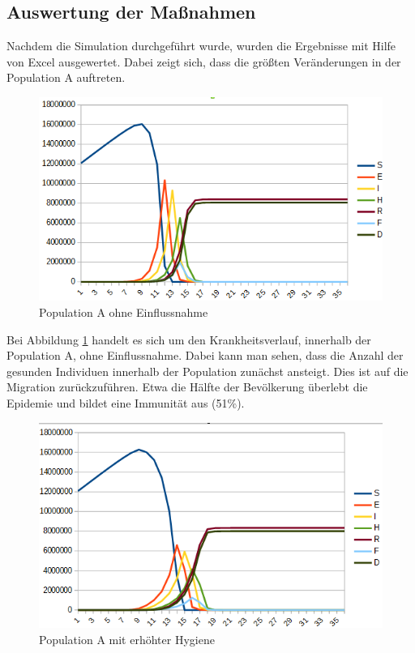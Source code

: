 \subsection{Auswertung der Maßnahmen}\label{ssec:actions:sim}

\ellen
Nachdem die Simulation durchgeführt wurde, wurden die Ergebnisse mit Hilfe von Excel ausgewertet. Dabei zeigt sich, dass die größten Veränderungen in der Population A auftreten.\\
\begin{figure}
 \includegraphics[width=1\textwidth]{massnahmen/A0}
\caption{Population A ohne Einflussnahme}
\label{fig:ssec:actions:A0}
\end{figure}
 Bei Abbildung \ref{fig:ssec:actions:A0} handelt es sich um den Krankheitsverlauf, innerhalb der Population A, ohne Einflussnahme. Dabei kann man sehen, dass die Anzahl der gesunden Individuen innerhalb der Population zunächst ansteigt. Dies ist auf die Migration zurückzuführen. Etwa die Hälfte der Bevölkerung überlebt die Epidemie und bildet eine Immunität aus (51\%).\\
 \begin{figure}
 \includegraphics[width=1\textwidth]{massnahmen/A1}
\caption{Population A mit erhöhter Hygiene}
\label{fig:ssec:actions:A1}
\end{figure}
